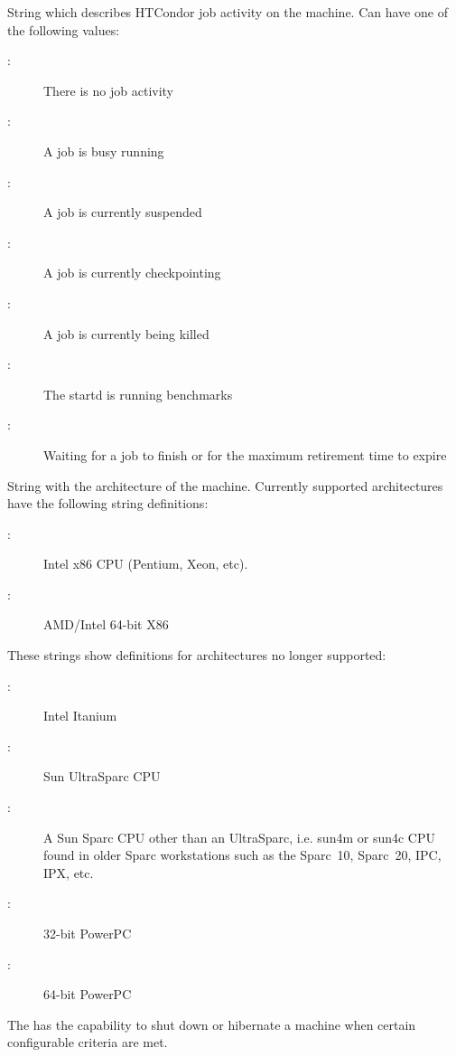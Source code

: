\begin{description}
%
\item[\AdAttr{Activity}:] String which describes HTCondor job activity on the machine.
Can have one of the following values:
	\begin{description}
	\item[:] There is no job activity
	\item[:] A job is busy running
	\item[:] A job is currently suspended
	\item[:] A job is currently checkpointing
	\item[:] A job is currently being killed
	\item[:] The startd is running benchmarks
	\item[:] Waiting for a job to finish or for the maximum retirement time to expire
	\end{description}
%
\label{Arch-machine-attribute}
\item[\AdAttr{Arch}:] String with the architecture of the machine.  
Currently supported architectures have the following string
definitions:
	\begin{description}
	\item[:] Intel x86 CPU (Pentium, Xeon, etc).
	\item[:] AMD/Intel 64-bit X86
	\end{description}
These strings show definitions for architectures no longer supported:
	\begin{description}
	\item[:] Intel Itanium
	\item[:] Sun UltraSparc CPU
	\item[:] A Sun Sparc CPU other than an UltraSparc, i.e.
sun4m or sun4c CPU found in older Sparc workstations such as the Sparc~10, 
Sparc~20, IPC, IPX, etc.
	\item[:] 32-bit PowerPC
	\item[:] 64-bit PowerPC
	\end{description}
%
\item[\AdAttr{CanHibernate}:] The  has the capability to 
shut down or hibernate a machine when certain configurable criteria are met.

\end{description}

